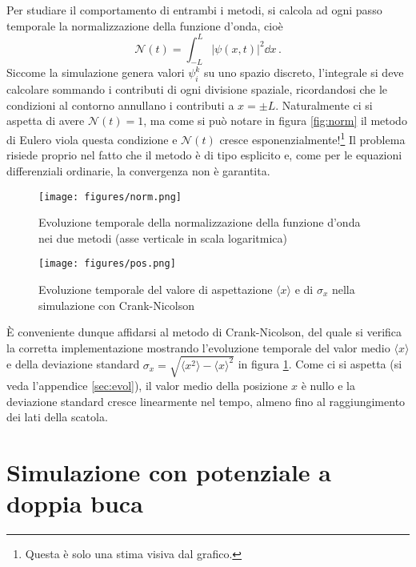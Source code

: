 \documentclass[a4paper, titlepage]{article}
\numberwithin{equation}{section}
\begin{document}
Per studiare il comportamento di entrambi i metodi, si calcola ad ogni passo temporale la normalizzazione della funzione d'onda, cioè
\[
    \mathcal{N}(t) = \int_{-L}^L |\psi(x,t)|^2 \dd{x}\, .
\]
Siccome la simulazione genera valori $\psi_i^k$ su uno spazio discreto, l'integrale si deve calcolare sommando i contributi di ogni divisione spaziale, ricordandosi che le condizioni al contorno annullano i contributi a $x = \pm L$.
Naturalmente ci si aspetta di avere $\mathcal{N}(t) = 1$, ma come si può notare in figura \ref{fig:norm} il metodo di Eulero viola questa condizione e $\mathcal{N}(t)$ cresce esponenzialmente!\footnote{Questa è solo una stima visiva dal grafico.}
Il problema risiede proprio nel fatto che il metodo è di tipo esplicito e, come per le equazioni differenziali ordinarie, la convergenza non è garantita. 

\begin{figure}[h!]
    \centering
    \begin{minipage}{0.47 \textwidth}
        \centering
        \texttt{[image: figures/norm.png]}
        \caption{Evoluzione temporale della normalizzazione della funzione d'onda nei due metodi (asse verticale in scala logaritmica)}
        \label{fig:norm}
    \end{minipage}
    \hspace{0.02\textwidth}
    \begin{minipage}{0.47 \textwidth}
        \centering
        \texttt{[image: figures/pos.png]}
        \caption{Evoluzione temporale del valore di aspettazione $\langle x \rangle$ e di $\sigma_x$ nella simulazione con Crank-Nicolson}
        \label{fig:pos}
    \end{minipage}
\end{figure}

È conveniente dunque affidarsi al metodo di Crank-Nicolson, del quale si verifica la corretta implementazione mostrando l'evoluzione temporale del valor medio $\langle x \rangle$ e della deviazione standard $\sigma_x = \sqrt{\langle x^2 \rangle - \langle x \rangle^2}$ in figura \ref{fig:pos}. Come ci si aspetta (si veda l'appendice \ref{sec:evol}), il valor medio della posizione $x$ è nullo e la deviazione standard cresce linearmente nel tempo, almeno fino al raggiungimento dei lati della scatola.


\section{Simulazione con potenziale a doppia buca}
\end{document}
